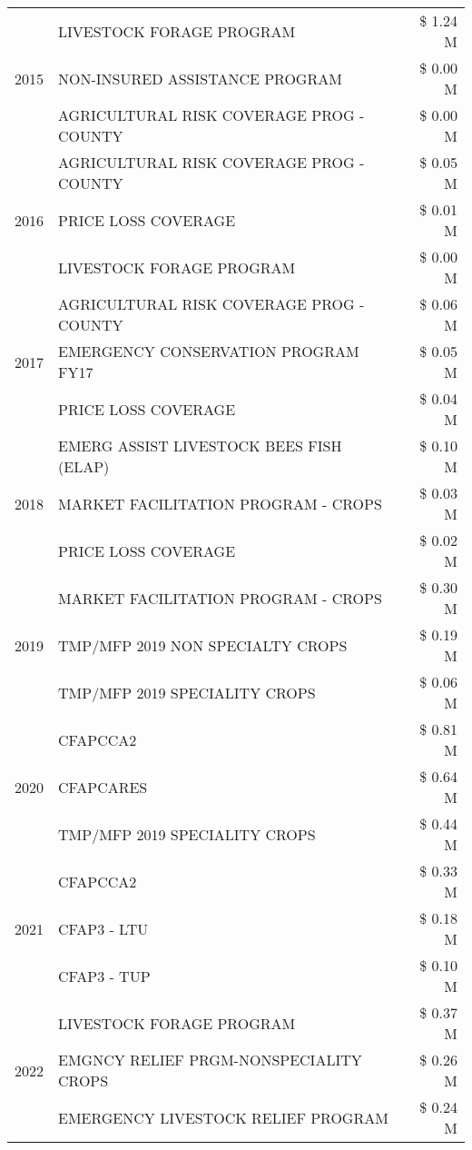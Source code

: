 \begin{tabular}{llr}
\cline{1-3}
\multirow[t]{3}{*}{2015} & LIVESTOCK FORAGE PROGRAM & \$ 1.24 M \\
 & NON-INSURED ASSISTANCE PROGRAM & \$ 0.00 M \\
 & AGRICULTURAL RISK COVERAGE PROG - COUNTY & \$ 0.00 M \\
\cline{1-3}
\multirow[t]{3}{*}{2016} & AGRICULTURAL RISK COVERAGE PROG - COUNTY & \$ 0.05 M \\
 & PRICE LOSS COVERAGE & \$ 0.01 M \\
 & LIVESTOCK FORAGE PROGRAM & \$ 0.00 M \\
\cline{1-3}
\multirow[t]{3}{*}{2017} & AGRICULTURAL RISK COVERAGE PROG - COUNTY & \$ 0.06 M \\
 & EMERGENCY CONSERVATION PROGRAM FY17 & \$ 0.05 M \\
 & PRICE LOSS COVERAGE & \$ 0.04 M \\
\cline{1-3}
\multirow[t]{3}{*}{2018} & EMERG ASSIST LIVESTOCK BEES FISH (ELAP) & \$ 0.10 M \\
 & MARKET FACILITATION PROGRAM - CROPS & \$ 0.03 M \\
 & PRICE LOSS COVERAGE & \$ 0.02 M \\
\cline{1-3}
\multirow[t]{3}{*}{2019} & MARKET FACILITATION PROGRAM - CROPS & \$ 0.30 M \\
 & TMP/MFP 2019 NON SPECIALTY CROPS & \$ 0.19 M \\
 & TMP/MFP 2019 SPECIALITY CROPS & \$ 0.06 M \\
\cline{1-3}
\multirow[t]{3}{*}{2020} & CFAPCCA2 & \$ 0.81 M \\
 & CFAPCARES & \$ 0.64 M \\
 & TMP/MFP 2019 SPECIALITY CROPS & \$ 0.44 M \\
\cline{1-3}
\multirow[t]{3}{*}{2021} & CFAPCCA2 & \$ 0.33 M \\
 & CFAP3 - LTU & \$ 0.18 M \\
 & CFAP3 - TUP & \$ 0.10 M \\
\cline{1-3}
\multirow[t]{3}{*}{2022} & LIVESTOCK FORAGE PROGRAM & \$ 0.37 M \\
 & EMGNCY RELIEF PRGM-NONSPECIALITY CROPS & \$ 0.26 M \\
 & EMERGENCY LIVESTOCK RELIEF PROGRAM & \$ 0.24 M \\
\cline{1-3}
\bottomrule
\end{tabular}
